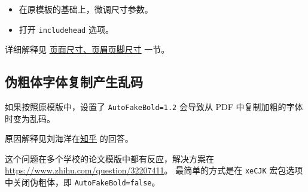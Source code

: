 \documentclass[../Main/thesis.tex]{subfiles}
\begin{document}
\begin{itemize}
\item
  在原模板的基础上，微调尺寸参数。

\begin{Shaded}
\begin{Highlighting}[]
\OtherTok{=}
\OtherTok{=}
\OtherTok{=}
\OtherTok{=}
\OtherTok{=}
\end{Highlighting}
\end{Shaded}
\item
  打开 \texttt{includehead} 选项。

\begin{Shaded}
\begin{Highlighting}[]
\OtherTok{=}\StringTok{,}
\OtherTok{=}
\OtherTok{=}
\OtherTok{=}\StringTok{,}
\OtherTok{=}
\OtherTok{=}
\end{Highlighting}
\end{Shaded}
\end{itemize}

详细解释见
\protect\hyperlink{geometry-ux5cux25e9ux5cux25a1ux5cux25b5ux5cux25e9ux5cux259dux5cux25a2ux5cux25e5ux5cux25b0ux5cux25baux5cux25e5ux5cux25afux5cux25b8ux5cux25e9ux5cux25a1ux5cux25b5ux5cux25e7ux5cux259cux5cux2589ux5cux25e9ux5cux25a1ux5cux25b5ux5cux25e8ux5cux2584ux5cux259aux5cux25e5ux5cux25b0ux5cux25baux5cux25e5ux5cux25afux5cux25b8}{页面尺寸、页眉页脚尺寸}
一节。

\subsection{伪粗体字体复制产生乱码}

如果按照原模版中，设置了 \texttt{AutoFakeBold=1.2} 会导致从 PDF
中复制加粗的字体时变为乱码。

原因解释见刘海洋在\href{https://www.zhihu.com/question/59597144}{知乎}
的回答。

这个问题在多个学校的论文模版中都有反应，解决方案在
\url{https://www.zhihu.com/question/32207411}。 最简单的方式是在
\texttt{xeCJK} 宏包选项中关闭伪粗体，即 \texttt{AutoFakeBold=false}。
\end{document}
